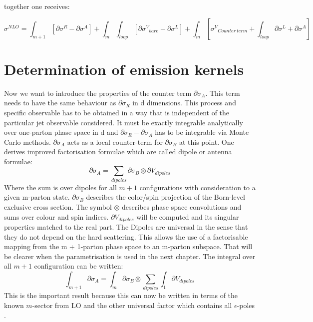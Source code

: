 together one receives:

\begin{equation}
\sigma^{NLO} = \int_{m+1} [\partial \sigma^R -\partial \sigma^A]+ \int_m \int_{loop}[ \partial {\sigma^V}_{bare}- \partial {\sigma^L}] + \int_m[{\sigma^V}_{Counter\:term}+ \int_{loop} \partial {\sigma^L}+\partial \sigma^A]
\end{equation}

\section*{Determination of emission kernels}
Now we want to introduce the properties of the counter term $ \partial \sigma_A $. This term needs to have the same behaviour as $ \partial \sigma_R $ in d dimensions. This process and specific observable has to be obtained in a way that is independent of the particular jet observable considered. It must be exactly integrable analytically over one-parton phase space in d and $ \partial \sigma_R -  \partial \sigma_A  $ has to be integrable via Monte Carlo methods. $ \partial \sigma_A $ acts as a local counter-term for $ \partial \sigma_B $ at this point. One derives improved factorisation formulae which are called dipole or antenna formulae:
\begin{equation}
\partial \sigma_A = \sum_{dipoles} \partial \sigma_{B} \otimes \partial V_{dipoles}
\end{equation}
Where the sum is over dipoles for all $ m+1 $ configurations with consideration to a given m-parton state. $  \partial \sigma_{B}$ describes the color/spin projection of the Born-level exclusive cross section.
The symbol $ \otimes $ describes phase space convolutions and sums over colour and spin indices. $ \partial V_{dipoles} $ will be computed and its singular properties matched to the real part. The Dipoles are universal in the sense that they do not depend on the hard scattering. This allows the use of a factorisable mapping from
the m + 1-parton phase space to an m-parton subspace. That will be clearer when the parametrisation is used in the next chapter. 
The integral over all $ m+1 $ configuration can be written:
\begin{equation}
\int_{m+1}\partial \sigma_A =  \int_{m} \partial \sigma_{B} \otimes \sum_{dipoles} \int_{1}\partial V_{dipoles}
\end{equation}
This is the important result because this can now be written in terms of the known $ m $-sector from LO and the other universal factor which contains all $ \epsilon $-poles \cite{Catani:2002hc}.
